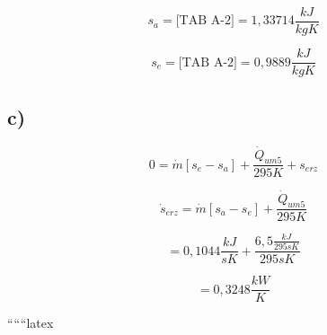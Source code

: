 \[
s_a = \text{[TAB A-2]} = 1,33714 \frac{kJ}{kgK}
\]

\[
s_e = \text{[TAB A-2]} = 0,9889 \frac{kJ}{kgK}
\]

\subsection*{c)}

\[
0 = \dot{m} [s_e - s_a] + \frac{\dot{Q}_{um5}}{295K} + s_{erz}
\]

\[
\dot{s}_{erz} = \dot{m} [s_a - s_e] + \frac{\dot{Q}_{um5}}{295K}
\]

\[
= 0,1044 \frac{kJ}{sK} + \frac{6,5 \frac{kJ}{295sK}}{295sK}
\]

\[
= 0,3248 \frac{kW}{K}
\]

``````latex


